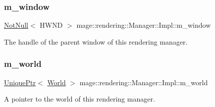 \subsubsection{\texorpdfstring{m\+\_\+window}{m\_window}}
{\footnotesize\ttfamily \mbox{\hyperlink{namespacemage_a8769f9d670d6b585ea306cb1062af94b}{Not\+Null}}$<$ H\+W\+ND $>$ mage\+::rendering\+::\+Manager\+::\+Impl\+::m\+\_\+window\hspace{0.3cm}{\ttfamily [private]}}

The handle of the parent window of this rendering manager. \mbox{\label{classmage_1_1rendering_1_1_manager_1_1_impl_ad262b9528ae867db6fe8b93b8de54cf1}} 
\subsubsection{\texorpdfstring{m\+\_\+world}{m\_world}}
{\footnotesize\ttfamily \mbox{\hyperlink{namespacemage_a3316d7143a973e37adf1110f2e80ca31}{Unique\+Ptr}}$<$ \mbox{\hyperlink{classmage_1_1rendering_1_1_world}{World}} $>$ mage\+::rendering\+::\+Manager\+::\+Impl\+::m\+\_\+world\hspace{0.3cm}{\ttfamily [private]}}

A pointer to the world of this rendering manager. 